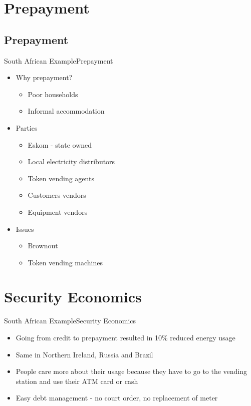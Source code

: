 \documentclass[10pt]{beamer}
\begin{document}
\section{Prepayment}
\subsection{Prepayment}
\begin{frame}{South African Example}{Prepayment}
  \begin{itemize}
  	\item Why prepayment?
  	\begin{itemize}
  		\item Poor households
  		\item Informal accommodation
  	\end{itemize}
    \item Parties
    \begin{itemize}
    	\item Eskom - state owned
    	\item Local electricity distributors
    	\item Token vending agents
    	\item Customers vendors
    	\item Equipment vendors
    \end{itemize}
    \item Issues
    \begin{itemize}
    	\item Brownout
    	\item Token vending machines
    \end{itemize}
  \end{itemize}
\end{frame}

\section{Security Economics}
\begin{frame}{South African Example}{Security Economics}
	\begin{itemize}
		\item Going from credit to prepayment resulted in 10\% reduced energy usage
		\item Same in Northern Ireland, Russia and Brazil
		\item People care more about their usage because they have to go to the vending station and use their ATM card or cash
		\item Easy debt management - no court order, no replacement of meter 
	\end{itemize}
\end{frame}
\end{document}
